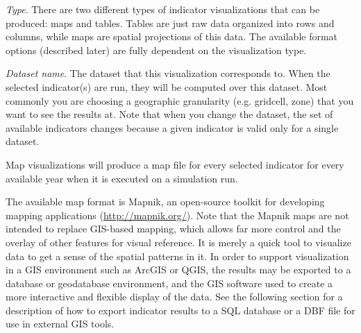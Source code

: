 \emph{Type}. There are two different types of indicator
visualizations that can be produced: maps and tables. Tables are just
raw data organized into rows and columns, while maps are
spatial projections of this data. The available format options
(described later) are fully dependent on the visualization type. 

\emph{Dataset name}. The dataset that this visualization corresponds
to. When the selected indicator(s) are run, they will be computed over
this dataset. Most commonly you are choosing a geographic granularity
(e.g. gridcell, zone) that you want to see the results at. Note that
when you change the dataset, the set of available indicators changes
because a given indicator is valid only for a single dataset.


Map visualizations  will produce a map file for every selected
indicator for every available year when it is executed on a
simulation run. 

The available map format is Mapnik, an open-source
toolkit for developing 
mapping applications (\url{http://mapnik.org/}).  Note that the Mapnik maps 
are not intended to replace GIS-based mapping, which allows far more 
control and the overlay of other features for visual reference. It 
is merely a quick tool to visualize data to get a sense of the 
spatial patterns in it.  In order to support visualization in a 
GIS environment such as ArcGIS or QGIS, 
the results may be exported 
to a database or geodatabase environment, and the GIS software used 
to create a more interactive and flexible display of the data. See 
the following section for a description of how to export indicator 
results to a SQL database or a DBF file
for use in external GIS tools.

